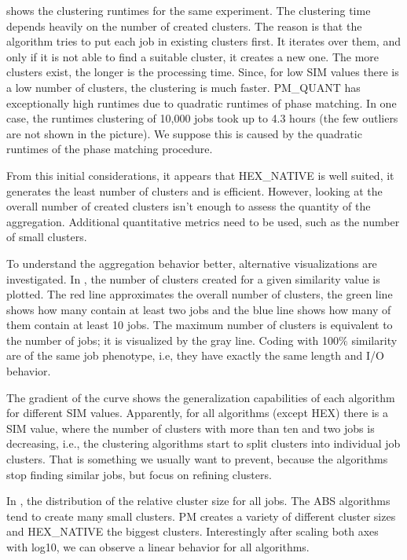 \documentclass{jhps}
\begin{document}
 shows the clustering runtimes for the same experiment.
The clustering time depends heavily on the number of created clusters.
The reason is that the algorithm tries to put each job in existing clusters first.
It iterates over them, and only if it is not able to find a suitable cluster, it creates a new one.
The more clusters exist, the longer is the processing time.
Since, for low SIM values there is a low number of clusters, the clustering is much faster.
PM\_QUANT has exceptionally high runtimes due to quadratic runtimes of phase matching.
In one case, the runtimes clustering of 10,000 jobs took up to 4.3 hours (the few outliers are not shown in the picture).
We suppose this is caused by the quadratic runtimes of the phase matching procedure.

From this initial considerations, it appears that HEX\_NATIVE is well suited, it generates the least number of clusters and is efficient.
However, looking at the overall number of created clusters isn't enough to assess the quantity of the aggregation.
Additional quantitative metrics need to be used, such as the number of small clusters.

\medskip

To understand the aggregation behavior better, alternative visualizations are investigated.
In , the number of clusters created for a given similarity value is plotted.
The red line approximates the overall number of clusters, the green line shows how many contain at least two jobs and the blue line shows how many of them contain at least 10 jobs.
The maximum number of clusters is equivalent to the number of jobs; it is visualized by the gray line.
Coding with 100$\%$  similarity are of the same job phenotype, i.e, they have exactly the same length and I/O behavior.

The gradient of the curve shows the generalization capabilities of each algorithm for different SIM values.
Apparently, for all algorithms (except HEX) there is a SIM value, where the number of clusters with more than ten and two jobs is decreasing, i.e., the clustering algorithms start to split clusters into individual job clusters.
That is something we usually want to prevent, because the algorithms stop finding similar jobs, but focus on refining clusters.

\smallskip

In , the distribution of the relative cluster size for all jobs.
The ABS algorithms tend to create many small clusters.
PM creates a variety of different cluster sizes and HEX\_NATIVE the biggest clusters.
Interestingly after scaling both axes with log10, we can observe a linear behavior for all algorithms.
\end{document}
